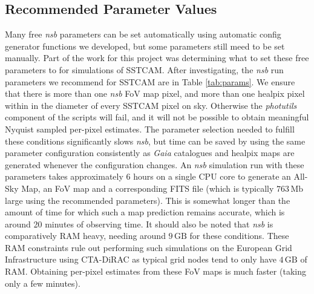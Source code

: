 \subsection{Recommended Parameter Values}
\label{sec:examples:params}

Many free \textit{nsb} parameters can be set automatically using automatic config generator functions we developed, but some parameters still meed to be set manually. Part of the work for this project was determining what to set these free parameters to for simulations of SSTCAM. After investigating, the \textit{nsb} run parameters we recommend for SSTCAM are in Table \ref{tab:params}. We ensure that there is more than one \textit{nsb} FoV map pixel, and more than one healpix pixel within in the diameter of every SSTCAM pixel on sky. Otherwise the \textit{photutils} component of the scripts will fail, and it will not be possible to obtain meaningful Nyquist sampled per-pixel estimates. The parameter selection needed to fulfill these conditions significantly slows \textit{nsb}, but time can be saved by using the same parameter configuration consistently as \textit{Gaia} catalogues and healpix maps are generated whenever the configuration changes. An \textit{nsb} simulation run with these parameters takes approximately 6 hours on a single CPU core to generate an All-Sky Map, an FoV map and a corresponding FITS file (which is typically $\mathrm{763\,Mb}$ large using the recommended parameters). This is somewhat longer than the amount of time for which such a map prediction remains accurate, which is around 20 minutes of observing time. It should also be noted that \textit{nsb} is comparatively RAM heavy, needing around $\mathrm{9\,GB}$ for these conditions. These RAM constraints rule out performing such simulations on the European Grid Infrastructure using CTA-DiRAC as typical grid nodes tend to only have $\mathrm{4\,GB}$ of RAM. Obtaining per-pixel estimates from these FoV maps is much faster (taking only a few minutes).

